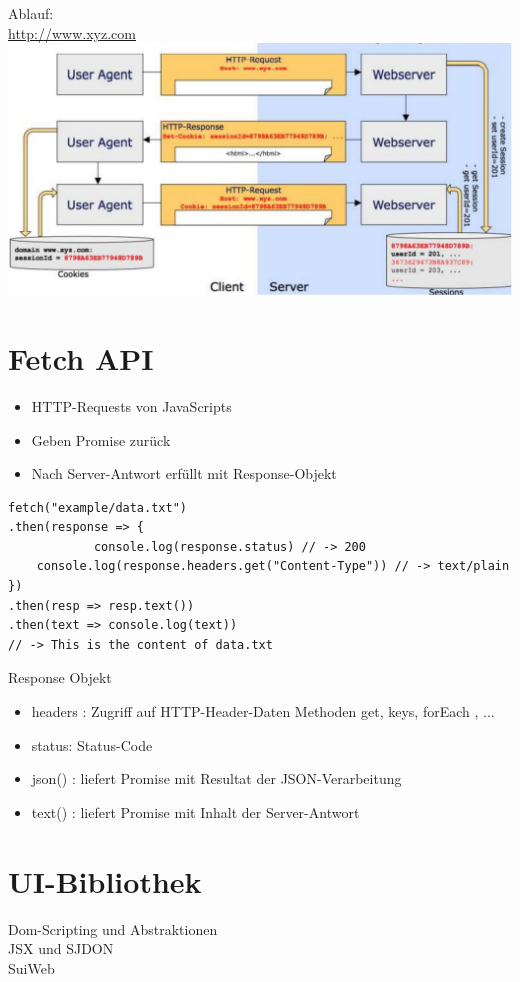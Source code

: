 \documentclass[10pt]{article}
\begin{document}
Ablauf:\\
\href{http://www.xyz.com}{http://www.xyz.com}\\
\includegraphics[max width=\textwidth, center]{2024_12_29_858f09cde51177c71657g-31(1)}

\section*{Fetch API}
\begin{itemize}
  \item HTTP-Requests von JavaScripts
  \item Geben Promise zurück
  \item Nach Server-Antwort erfüllt mit Response-Objekt
\end{itemize}

\begin{verbatim}
fetch("example/data.txt")
.then(response => {
            console.log(response.status) // -> 200
    console.log(response.headers.get("Content-Type")) // -> text/plain
})
.then(resp => resp.text())
.then(text => console.log(text))
// -> This is the content of data.txt
\end{verbatim}

Response Objekt

\begin{itemize}
  \item headers : Zugriff auf HTTP-Header-Daten Methoden get, keys, forEach , ...
  \item status: Status-Code
  \item json() : liefert Promise mit Resultat der JSON-Verarbeitung
  \item text() : liefert Promise mit Inhalt der Server-Antwort
\end{itemize}

\section*{UI-Bibliothek}
Dom-Scripting und Abstraktionen\\
JSX und SJDON\\
SuiWeb
\end{document}
